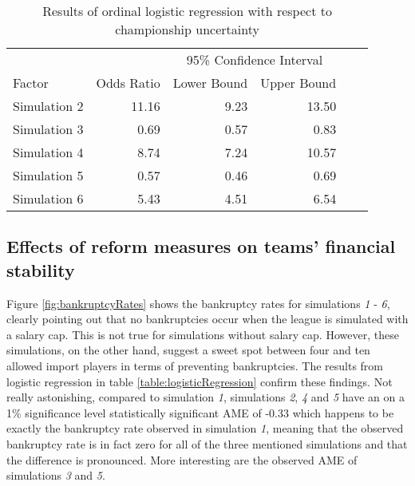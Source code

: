 \documentclass[12pt, a4paper]{article}
\begin{document}
\begin{table}[!ht]
    \centering
    \begin{threeparttable}
        \caption{Results of ordinal logistic regression with respect to championship uncertainty}
        \label{table:uniqueChampions}
        \begin{tabular}{lrrrrr}
          \toprule
          \multicolumn{2}{c}{} & \multicolumn{2}{c}{95\% Confidence Interval} \\
          Factor & Odds Ratio & Lower Bound & Upper Bound \\ 
          \midrule
          Simulation 2 & 11.16 & 9.23 & 13.50 \\ 
          Simulation 3 & 0.69 & 0.57 & 0.83 \\ 
          Simulation 4 & 8.74 & 7.24 & 10.57 \\ 
          Simulation 5 & 0.57 & 0.46 & 0.69 \\ 
          Simulation 6 & 5.43 & 4.51 & 6.54 \\ 
           \bottomrule
        \end{tabular}
    \end{threeparttable}
\end{table}
\vspace{0.5 cm}

\subsection{Effects of reform measures on teams' financial stability}

Figure \ref{fig:bankruptcyRates} shows the bankruptcy rates for simulations \textit{1} - \textit{6}, clearly pointing out that no bankruptcies occur when the league is simulated with a salary cap. This is not true for simulations without salary cap. However, these simulations, on the other hand, suggest a sweet spot between four and ten allowed import players in terms of preventing bankruptcies. The results from logistic regression in table \ref{table:logisticRegression} confirm these findings. Not really astonishing, compared to simulation \textit{1}, simulations \textit{2}, \textit{4} and \textit{5} have an on a 1\% significance level statistically significant AME of -0.33 which happens to be exactly the bankruptcy rate observed in simulation \textit{1}, meaning that the observed bankruptcy rate is in fact zero for all of the three mentioned simulations and that the difference is pronounced. More interesting are the observed AME of simulations \textit{3} and \textit{5}. 
\end{document}
